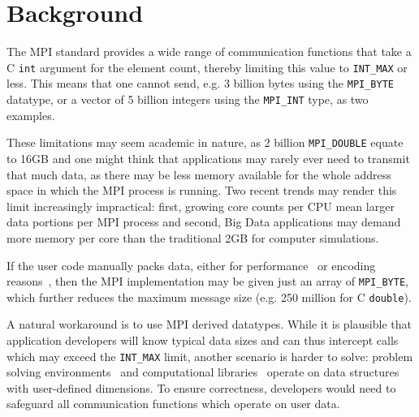 
\section{Background}

The MPI standard provides a wide range of communication functions that
take a C \texttt{int} argument for the element count, thereby limiting this
value to \texttt{INT\_MAX} or less.
This means that one cannot send, e.g. 3 billion bytes using the \texttt{MPI\_BYTE} 
datatype, or a vector of 5 billion integers using the \texttt{MPI\_INT} type, as
two examples.

These limitations may seem academic in nature, as 2 billion
\texttt{MPI\_DOUBLE} equate to 16GB and one might think that
applications may rarely ever need to transmit that much data, as there
may be less memory available for the whole address space in which the MPI
process is running.
Two recent trends may render this limit increasingly impractical: 
first, growing core counts per CPU mean larger data portions per MPI 
process and second, Big Data applications may demand more memory 
per core than the traditional 2GB for computer simulations.

If the user code manually packs data, either for
performance~\cite{jenkins2012enabling} or encoding
reasons~\cite{boostmpi}, then the MPI implementation may be given just
an array of \texttt{MPI\_BYTE}, which further reduces the maximum
message size (e.g. 250 million for C \texttt{double}).

A natural workaround is to use MPI derived datatypes. While it is
plausible that application developers will know typical data sizes and
can thus intercept calls which may exceed the \texttt{INT\_MAX} limit,
another scenario is harder to solve: problem solving
environments~\cite{cactus:SC01, gromacs} and computational
libraries~\cite{physis, libgeodecomp} operate on data structures with
user-defined dimensions. To ensure correctness, developers would need
to safeguard all communication functions which operate on user data.

%

